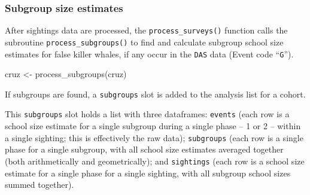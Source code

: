 \documentclass[
]{book}
\newenvironment{Shaded}{\begin{snugshade}}{\end{snugshade}}
\newcommand{\DecValTok}[1]{\textcolor[rgb]{0.00,0.00,0.81}{#1}}
\newcommand{\FunctionTok}[1]{\textcolor[rgb]{0.00,0.00,0.00}{#1}}
\newcommand{\NormalTok}[1]{#1}
\newcommand{\OtherTok}[1]{\textcolor[rgb]{0.56,0.35,0.01}{#1}}
\newcommand{\SpecialCharTok}[1]{\textcolor[rgb]{0.00,0.00,0.00}{#1}}
\newcommand{\StringTok}[1]{\textcolor[rgb]{0.31,0.60,0.02}{#1}}
\begin{document}
\hypertarget{subgroups}{%
\subsubsection*{Subgroup size estimates}\label{subgroups}}

After sightings data are processed, the \texttt{process\_surveys()} function calls the subroutine \texttt{process\_subgroups()} to find and calculate subgroup school size estimates for false killer whales, if any occur in the \texttt{DAS} data (Event code ``\texttt{G}'').

\begin{Shaded}
\begin{Highlighting}[]
\NormalTok{cruz }\OtherTok{\textless{}{-}} \FunctionTok{process\_subgroups}\NormalTok{(cruz) }
\end{Highlighting}
\end{Shaded}

If subgroups are found, a \texttt{subgroups} slot is added to the analysis list for a cohort.

\begin{Shaded}
\end{Shaded}

This \texttt{subgroups} slot holds a list with three dataframes: \texttt{events} (each row is a school size estimate for a single subgroup during a single phase -- 1 or 2 -- within a single sighting; this is effectively the raw data); \texttt{subgroups} (each row is a single phase for a single subgroup, with all school size estimates averaged together (both arithmetically and geometrically); and \texttt{sightings} (each row is a school size estimate for a single phase for a single sighting, with all subgroup school sizes summed together).

\begin{Shaded}
\end{Shaded}
\end{document}
